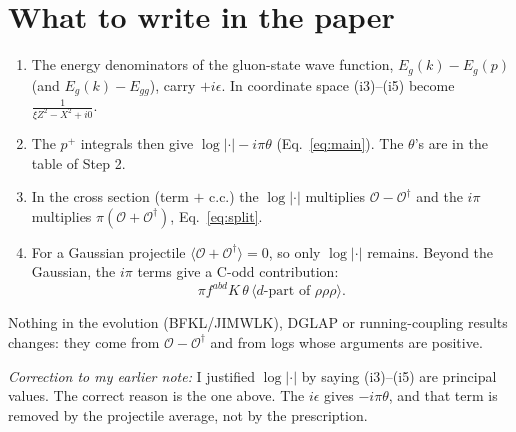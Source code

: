 \documentclass[10pt]{article}
\numberwithin{equation}{section}
\begin{document}
\section{What to write in the paper}
\begin{enumerate}
\item The energy denominators of the gluon-state wave function, $E_g(k)-E_g(p)$ (and $E_g(k)-E_{gg}$), carry $+i\epsilon$. In coordinate space (i3)--(i5) become $\frac{1}{\xi Z^2-X^2+i0}$.
\item The $p^+$ integrals then give $\log|\cdot|-i\pi\theta$ (Eq.~\ref{eq:main}). The $\theta$'s are in the table of Step 2.
\item In the cross section (term $+$ c.c.) the $\log|\cdot|$ multiplies $\mathcal O-\mathcal O^\dagger$ and the $i\pi$ multiplies $\pi(\mathcal O+\mathcal O^\dagger)$, Eq.~\eqref{eq:split}.
\item For a Gaussian projectile $\langle\mathcal O+\mathcal O^\dagger\rangle=0$, so only $\log|\cdot|$ remains. Beyond the Gaussian, the $i\pi$ terms give a C-odd contribution:
\begin{equation*}
\pi f^{abd}K\,\theta\,\langle d\text{-part of }\rho\rho\rho\rangle .
\end{equation*}
\end{enumerate}
Nothing in the evolution (BFKL/JIMWLK), DGLAP or running-coupling results changes: they come from $\mathcal O-\mathcal O^\dagger$ and from logs whose arguments are positive.

\noindent\textit{Correction to my earlier note:} I justified $\log|\cdot|$ by saying (i3)--(i5) are principal values. The correct reason is the one above. The $i\epsilon$ gives $-i\pi\theta$, and that term is removed by the projectile average, not by the prescription.
\end{document}
